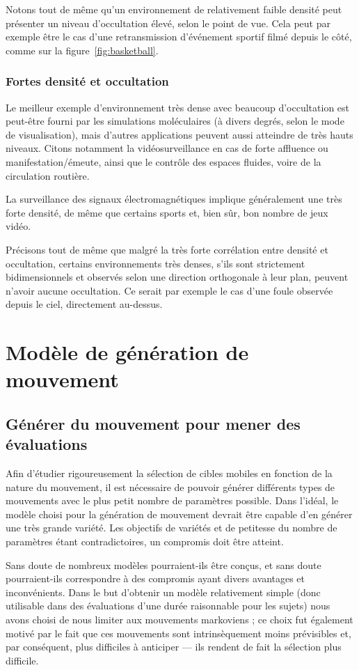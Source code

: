 	Notons tout de même qu'un environnement de relativement faible densité peut présenter un niveau d'occultation élevé, selon le point de vue. Cela peut par exemple être le cas d'une retransmission d'événement sportif filmé depuis le côté, comme sur la figure~\ref{fig:basketball}.
	
	\FloatBarrier \subsubsection{Fortes densité et occultation}
	Le meilleur exemple d'environnement très dense avec beaucoup d'occultation est peut-être fourni par les simulations moléculaires (à divers degrés, selon le mode de visualisation), mais d'autres applications peuvent aussi atteindre de très hauts niveaux. Citons notamment la vidéosurveillance en cas de forte affluence ou manifestation/émeute, ainsi que le contrôle des espaces fluides, voire de la circulation routière.
	
	La surveillance des signaux électromagnétiques implique généralement une très forte densité, de même que certains sports et, bien sûr, bon nombre de jeux vidéo.
	
	Précisons tout de même que malgré la très forte corrélation entre densité et occultation, certains environnements très denses, s'ils sont strictement bidimensionnels et observés selon une direction orthogonale à leur plan, peuvent n'avoir aucune occultation. Ce serait par exemple le cas d'une foule observée depuis le ciel, directement au-dessus.
	
\section{Modèle de génération de mouvement}
	\FloatBarrier \subsection{Générer du mouvement pour mener des évaluations}
	Afin d'étudier rigoureusement la sélection de cibles mobiles en fonction de la nature du mouvement, il est nécessaire de pouvoir générer différents types de mouvements avec le plus petit nombre de paramètres possible. Dans l'idéal, le modèle choisi pour la génération de mouvement devrait être capable d'en générer une très grande variété. Les objectifs de variétés et de petitesse du nombre de paramètres étant contradictoires, un compromis doit être atteint.
	
	Sans doute de nombreux modèles pourraient-ils être conçus, et sans doute pourraient-ils correspondre à des compromis ayant divers avantages et inconvénients. Dans le but d'obtenir un modèle relativement simple (donc utilisable dans des évaluations d'une durée raisonnable pour les sujets) nous avons choisi de nous limiter aux mouvements markoviens ; ce choix fut également motivé par le fait que ces mouvements sont intrinsèquement moins prévisibles et, par conséquent, plus difficiles à anticiper --- ils rendent de fait la sélection plus difficile.
	
